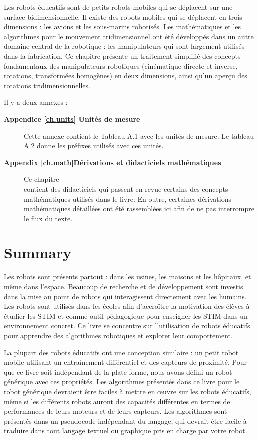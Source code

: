 {\begin{description}
\smallskip
\item [\textbf{Chapitre \ref{ch.kinematics} Cinématique d'un manipulateur robotique}] Les robots éducatifs sont de petits robots mobiles qui se déplacent sur une surface bidimensionnelle. Il existe des robots mobiles qui se déplacent en trois dimensions : les avions et les sous-marins robotisés. Les mathématiques et les algorithmes pour le mouvement tridimensionnel ont été développés dans un autre domaine central de la robotique : les manipulateurs qui sont largement utilisés dans la fabrication. Ce chapitre présente un traitement simplifié des concepts fondamentaux des manipulateurs robotiques (cinématique directe et inverse, rotations, transformées homogènes) en deux dimensions, ainsi qu'un aperçu des rotations tridimensionnelles.
\end{description}

Il y a deux annexes :
\begin{description}
\item [\textbf{Appendice \ref{ch.units} Unités de mesure}] Cette annexe contient le Tableau A.1 avec les unités de mesure. Le tableau A.2 donne les préfixes utilisés avec ces unités.
\smallskip
\item [\textbf{Appendix \ref{ch.math}Dérivations et didacticiels mathématiques}] Ce chapitre\\
contient des didacticiels qui passent en revue certains des concepts mathématiques utilisés dans le livre. En outre, certaines dérivations mathématiques détaillées ont été rassemblées ici afin de ne pas interrompre le flux du texte.
\end{description}

\section{Summary}

Les robots sont présents partout : dans les usines, les maisons et les hôpitaux, et même dans l'espace. Beaucoup de recherche et de développement sont investis dans la mise au point de robots qui interagissent directement avec les humains. Les robots sont utilisés dans les écoles afin d'accroître la motivation des élèves à étudier les STIM et comme outil pédagogique pour enseigner les STIM dans un environnement concret. Ce livre se concentre sur l'utilisation de robots éducatifs pour apprendre des algorithmes robotiques et explorer leur comportement.

La plupart des robots éducatifs ont une conception similaire : un petit robot mobile utilisant un entraînement différentiel et des capteurs de proximité. Pour que ce livre soit indépendant de la plate-forme, nous avons défini un robot générique avec ces propriétés. Les algorithmes présentés dans ce livre pour le robot générique devraient être faciles à mettre en œuvre sur les robots éducatifs, même si les différents robots auront des capacités différentes en termes de performances de leurs moteurs et de leurs capteurs. Les algorithmes sont présentés dans un pseudocode indépendant du langage, qui devrait être facile à traduire dans tout langage textuel ou graphique pris en charge par votre robot.

}
